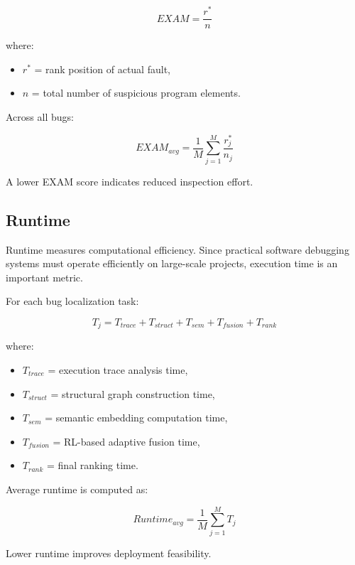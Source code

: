 \documentclass[article,article,submit,pdftex,moreauthors]{Definitions/mdpi}
\begin{document}
\begin{equation}
EXAM =
\frac{r^*}{n}
\end{equation}

where:
\begin{itemize}
    \item $r^*$ = rank position of actual fault,
    \item $n$ = total number of suspicious program elements.
\end{itemize}

Across all bugs:

\begin{equation}
EXAM_{avg} =
\frac{1}{M}
\sum_{j=1}^{M}
\frac{r_j^*}{n_j}
\end{equation}

A lower EXAM score indicates reduced inspection effort.

\subsection{Runtime}

Runtime measures computational efficiency. Since practical software debugging systems must operate efficiently on large-scale projects, execution time is an important metric.

For each bug localization task:

\begin{equation}
T_j =
T_{trace}
+
T_{struct}
+
T_{sem}
+
T_{fusion}
+
T_{rank}
\end{equation}

where:
\begin{itemize}
    \item $T_{trace}$ = execution trace analysis time,
    \item $T_{struct}$ = structural graph construction time,
    \item $T_{sem}$ = semantic embedding computation time,
    \item $T_{fusion}$ = RL-based adaptive fusion time,
    \item $T_{rank}$ = final ranking time.
\end{itemize}

Average runtime is computed as:

\begin{equation}
Runtime_{avg} =
\frac{1}{M}
\sum_{j=1}^{M} T_j
\end{equation}

Lower runtime improves deployment feasibility.
\end{document}
